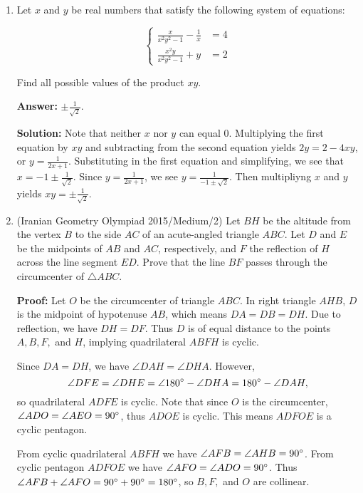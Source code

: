\documentclass[11pt,paper=letter]{scrartcl}
\begin{document}
\begin{enumerate}[left=0pt]

\item Let $x$ and $y$ be real numbers that satisfy the following system of equations:

\begin{equation*}
  \left\{ \begin{aligned}
    \frac{x}{x^2y^2 - 1} - \frac{1}{x} &= 4\\
    \frac{x^2y}{x^2y^2 - 1} + y &= 2
  \end{aligned}
  \right .
\end{equation*}

Find all possible values of the product $xy$.

\textbf{Answer:} $\boxed{\pm \frac{1}{\sqrt{2}}}$.

\textbf{Solution:} Note that neither $x$ nor $y$ can equal $0$. Multiplying the first equation by $xy$ and subtracting from the second equation yields $2y = 2 - 4xy$, or $y = \frac{1}{2x+1}$. Substituting in the first equation and simplifying, we see that $x = -1 \pm \frac{1}{\sqrt{2}}$. Since $y = \frac{1}{2x+ 1}$, we see $y = \frac{1}{-1 \pm \sqrt{2}}$. Then multipliyng $x$ and $y$ yields $xy = \pm \frac{1}{\sqrt{2}}$.

\item (Iranian Geometry Olympiad 2015/Medium/2) Let $BH$ be the altitude from the vertex $B$ to the side $AC$ of an acute-angled triangle $ABC$. Let $D$ and $E$ be the midpoints of $AB$ and $AC$, respectively, and $F$ the reflection of $H$ across the line segment $ED$. Prove that the line $BF$ passes through the circumcenter of $\triangle ABC$.

\textbf{Proof:} Let $O$ be the circumcenter of triangle $ABC$. In right triangle $AHB$, $D$ is the midpoint of hypotenuse $AB$, which means $DA = DB = DH$. Due to reflection, we have $DH = DF$. Thus $D$ is of equal distance to the points $A, B, F,$ and $H$, implying quadrilateral $ABFH$ is cyclic.

Since $DA = DH$, we have $\angle DAH = \angle DHA$. However, $$\angle DFE = \angle DHE = \angle 180^\circ - \angle DHA = 180^\circ - \angle DAH,$$ so quadrilateral $ADFE$ is cyclic. Note that since $O$ is the circumcenter, $\angle ADO = \angle AEO = 90^\circ$, thus $ADOE$ is cyclic. This means $ADFOE$ is a cyclic pentagon.

From cyclic quadrilateral $ABFH$ we have $\angle AFB = \angle AHB = 90^\circ$. From cyclic pentagon $ADFOE$ we have $\angle AFO = \angle ADO = 90^\circ$. Thus $\angle AFB + \angle AFO = 90^\circ + 90^\circ = 180^\circ$, so $B, F,$ and $O$ are collinear.


\end{enumerate}
\end{document}
